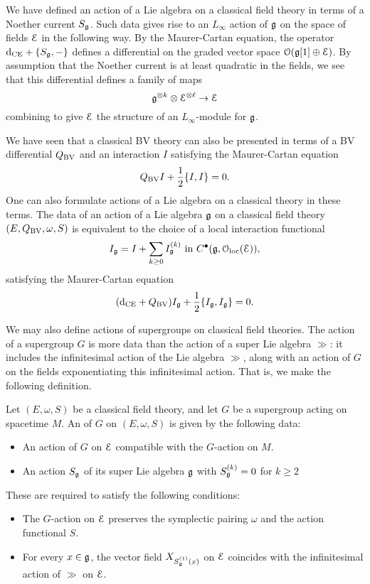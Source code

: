 \documentclass[10pt, oneside]{article}
\begin{document}
\begin{remark}
We have defined an action of a Lie algebra on a classical field theory in terms of a Noether current $S_\mathfrak g$.
Such data gives rise to an $L_\infty$ action of $\mathfrak g$ on the space of fields $\mathcal E$ in the following way.
By the Maurer-Cartan equation, the operator ${\rm d}_{\mathrm{CE}} + \{S_\mathfrak g, -\}$ 
defines a differential on the graded vector space $\mathcal O(\mathfrak g[1] \oplus \mathcal E)$. 
By assumption that the Noether current is at least quadratic in the fields, we see that this differential defines a family of maps
\[
\mathfrak g^{\otimes k} \otimes \mathcal E^{\otimes \ell} \to \mathcal E
\]
combining to give $\mathcal E$ the structure of an $L_\infty$-module for $\mathfrak g$.
\end{remark}

\begin{remark}
We have seen that a classical BV theory can also be presented in terms of a BV differential $Q_{\mathrm{BV}}$ and an interaction $I$ satisfying the Maurer-Cartan equation
\[Q_{\mathrm{BV}} I + \frac{1}{2} \{I,I\} = 0 .\]
One can also formulate actions of a Lie algebra on a classical theory in these terms. 
The data of an action of a Lie algebra $\mathfrak g$ on a classical field theory $(E, Q_{\mathrm{BV}}, \omega, S)$ is equivalent to the choice of a local interaction functional 
\[I_\mathfrak g = I + \sum_{k\geq 0} I_{\mathfrak g}^{(k)} \text{ in } C^\bullet(\mathfrak g, \mathcal{O}_{\rm loc}(\mathcal E)),\]
satisfying the Maurer-Cartan equation
\[({\rm d}_{\mathrm{CE}} + Q_{\mathrm{BV}}) I_\mathfrak g + \frac{1}{2} \{I_\mathfrak g, I_\mathfrak g\} = 0.\]
\end{remark}

We may also define actions of supergroups on classical field theories.  The action of a supergroup $G$ is more data than the action of a super Lie algebra $\gg$: it includes the infinitesimal action of the Lie algebra $\gg$, along with an action of $G$ on the fields exponentiating this infinitesimal action.  That is, we make the following definition.

\begin{definition}
\label{group_action_def}
Let $(E, \omega, S)$ be a classical field theory, and let $G$ be a supergroup acting on spacetime $M$. An  of $G$ on $(E, \omega, S)$ is given by the following data:
\begin{itemize}
\item An action of $G$ on $\mathcal E$ compatible with the $G$-action on $M$.

\item An action $S_\mathfrak g$ of its super Lie algebra $\mathfrak g$ with $S^{(k)}_\mathfrak g = 0$ for $k\geq 2$ 
\end{itemize}
These are required to satisfy the following conditions:
\begin{itemize}
\item The $G$-action on $\mathcal E$ preserves the symplectic pairing $\omega$ and the action functional $S$.

\item For every $x\in\mathfrak g$, the vector field $X_{{S^{(1)}_\mathfrak g}(x)}$ on $\mathcal E$ coincides with the infinitesimal action of $\gg$ on $\mathcal E$.
\end{itemize}
\end{definition}
\end{document}
